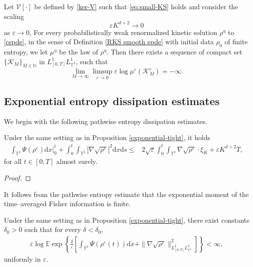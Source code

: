 \begin{prop}\label{exponential-tight}
Let $\mathcal{V}[\cdot]$ be defined by \eqref{ker-V} such that \eqref{eq:small-KS} holds and consider the scaling 
\begin{equation}\label{scale1}
\varepsilon K^{d+2}\rightarrow 0 
 \end{equation}
 as $\varepsilon\rightarrow 0$,
For every probabilistically weak renormalized kinetic solution $\rho^{\eta}$ to \eqref{cspde}, in the sense of Definition \ref{RKS smooth spde} with initial data $\rho_0$ of finite entropy, we let $\mu^{\eta}$ be the law of $\rho^{\eta}$. Then there exists a sequence of compact set $\{\mathcal{K}_M\}_{M\in\mathbb{N}}$ in $L^1_{[0,T]}L^1_{\mathbb{T}^2}$, such that
\begin{equation}\label{ec2-2}
  \lim_{M\to \infty}\limsup_{\varepsilon\to 0}\varepsilon \log\mu^{\varepsilon}(\mathcal{K}^c_M) = -\infty.
\end{equation}
\end{prop}

\subsection{Exponential entropy dissipation estimates}


We begin with the following pathwise entropy dissipation estimates.
\begin{lem}\label{pathwise-entropy}Under the same setting as in Proposition \ref{exponential-tight}, it holds 
\begin{align*}
\int_{\mathbb{T}^2}\Psi(\rho^{\varepsilon})\mathrm{d}x \Big|^t_0 +\int_0^t\int_{\mathbb{T}^2}
|\nabla\sqrt{\rho^{\varepsilon}}|^2\mathrm{d}x\mathrm{d}s
\leq&2\sqrt{\varepsilon}\int_0^t\int_{\mathbb{T}^2}
\nabla\sqrt{\rho^{\varepsilon}} \cdot
\xi_{K}
+\varepsilon K^{d+2}T,
\end{align*}
for all $t \in [0,T]$ almost surely.
\end{lem}
\begin{proof}
	
\end{proof}


It follows from the pathwise entropy estimate that the exponential moment of the time--averaged Fisher information is finite. 

\begin{lem}\label{exponential-entropy}
Under the same setting as in Proposition \ref{exponential-tight}, there exist constants $\delta_0>0$ such that for every $\delta <\delta_0$,
\begin{align}\label{eq:exp-moment-fisher}
 \varepsilon \log
\mathbb{E}\exp\left\{\frac{\delta}{\varepsilon }\left[\int_{\mathbb{T}^2}\Psi(\rho^{\varepsilon}(t))\mathrm{d}x+\|\nabla \sqrt{\rho^{\varepsilon}}\|_{L^2_{[0,T]}L^2_{\mathbb{T}^2}}^{2}\right]\right\} < \infty,
  \end{align}
uniformly in $\varepsilon$. 
\end{lem}

